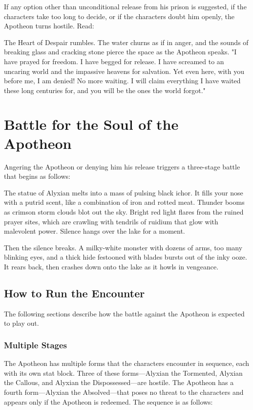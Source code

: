 \documentclass[10pt,a4paper,twoside,bg=print,twocolumn,openany,nodeprecatedcode]{dndbook}
\begin{document}
If any option other than unconditional release from his prison is suggested, if the characters take too long to decide, or if the characters doubt him openly, the Apotheon turns hostile. Read:

\begin{DndReadAloud}{}
The Heart of Despair rumbles. The water churns as if in anger, and the sounds of breaking glass and cracking stone pierce the space as the Apotheon speaks. "I have prayed for freedom. I have begged for release. I have screamed to an uncaring world and the impassive heavens for salvation. Yet even here, with you before me, I am denied! No more waiting. I will claim everything I have waited these long centuries for, and you will be the ones the world forgot."

\end{DndReadAloud}

\section{Battle for the Soul of the Apotheon}
Angering the Apotheon or denying him his release triggers a three-stage battle that begins as follows:

\begin{DndReadAloud}{}
The statue of Alyxian melts into a mass of pulsing black ichor. It fills your nose with a putrid scent, like a combination of iron and rotted meat. Thunder booms as crimson storm clouds blot out the sky. Bright red light flares from the ruined prayer sites, which are crawling with tendrils of ruidium that glow with malevolent power. Silence hangs over the lake for a moment.

Then the silence breaks. A milky-white monster with dozens of arms, too many blinking eyes, and a thick hide festooned with blades bursts out of the inky ooze. It rears back, then crashes down onto the lake as it howls in vengeance.

\end{DndReadAloud}

\subsection{How to Run the Encounter}
The following sections describe how the battle against the Apotheon is expected to play out.

\subsubsection{Multiple Stages}
The Apotheon has multiple forms that the characters encounter in sequence, each with its own stat block. Three of these forms—Alyxian the Tormented, Alyxian the Callous, and Alyxian the Dispossessed—are hostile. The Apotheon has a fourth form—Alyxian the Absolved—that poses no threat to the characters and appears only if the Apotheon is redeemed. The sequence is as follows:
\end{document}

